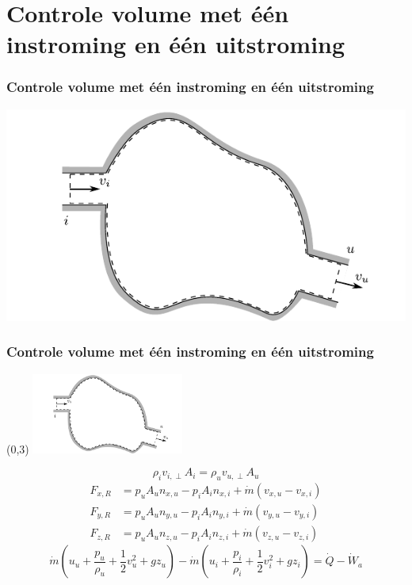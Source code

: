 \documentclass[t]{beamer}
\begin{document}
	\section{Controle volume met één instroming en één uitstroming}	
  		\begin{frame}
			\frametitle{Controle volume met één instroming en één uitstroming}
			\vspace{1cm}
			\centering
			\includegraphics{fig/controlevolumes/Controlevolume_een_in_en_uitstroming}
		\end{frame}
  		\begin{frame}
			\frametitle{Controle volume met één instroming en één uitstroming}
			\begin{textblock}{5}(0,3)
            	\includegraphics[width=5cm]{fig/controlevolumes/Controlevolume_een_in_en_uitstroming}
        	\end{textblock}
        	\vspace{2cm}
			\begin{equation}
				\rho_i v_{i,\perp} A_i = \rho_u v_{u,\perp} A_u
				\label{eqn:behoud van massa in een stationair controlevolume met een in en uitstroming}
			\end{equation}
			\pause
			\begin{align}
				F_{x,R} &= p_{u} A_u n_{x,u} - p_{i} A_i n_{x,i} + \dot{m} (v_{x,u}-v_{x,i}) \nonumber \\
				F_{y,R} &= p_{u} A_u n_{y,u} - p_{i} A_i n_{y,i} + \dot{m} (v_{y,u}-v_{y,i}) \\
				F_{z,R} &= p_{u} A_u n_{z,u} - p_{i} A_i n_{z,i} + \dot{m} (v_{z,u}-v_{z,i}) \nonumber
				\label{eqn:behoud van impuls in een stationair controlevolume met een in en uitstroming geprojecteerd2}
			\end{align}
			\pause
			\begin{equation}
				\dot{m} (u_u + \frac{p_u}{\rho_u} + \frac{1}{2}v^2_u + g z_u) - \dot{m} (u_i + \frac{p_i}{\rho_i}+ \frac{1}{2}v^2_i + g z_i) = \dot{Q}-\dot{W}_a
				\label{eqn:behoud van energie in een controlevolume met een in en uitstroming asvermogen}
			\end{equation}
		\end{frame}
\end{document}
